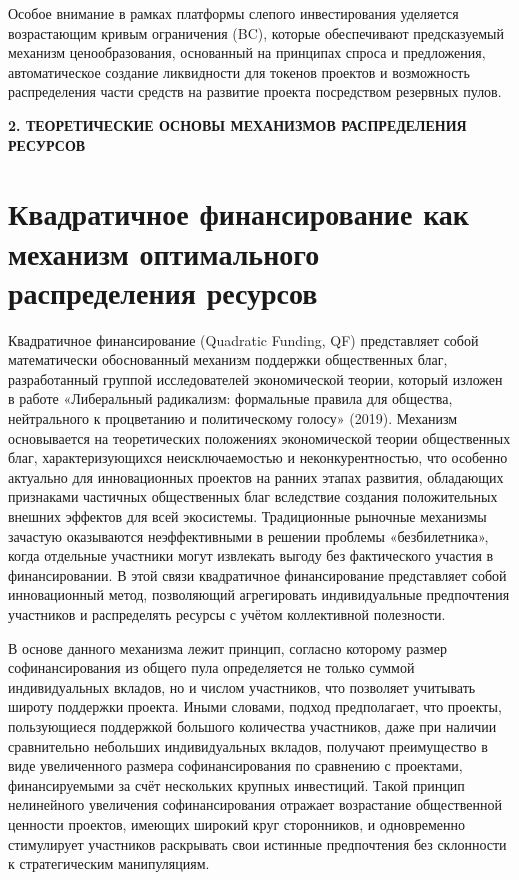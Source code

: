 \documentclass[
    candidate, %
    subf, %
    dotsinheaders=false,
]{disser}
\begin{document}
Особое внимание в рамках платформы слепого инвестирования уделяется возрастающим кривым ограничения (BC), которые обеспечивают предсказуемый механизм ценообразования, основанный на принципах спроса и предложения, автоматическое создание ликвидности для токенов проектов и возможность распределения части средств на развитие проекта посредством резервных пулов.

\newpage
\begin{center}
  \textbf{2. ТЕОРЕТИЧЕСКИЕ ОСНОВЫ МЕХАНИЗМОВ РАСПРЕДЕЛЕНИЯ РЕСУРСОВ}
  \end{center}

  \section{Квадратичное финансирование как механизм оптимального распределения ресурсов}

  Квадратичное финансирование (Quadratic Funding, QF) представляет собой математически обоснованный механизм поддержки общественных благ, разработанный группой исследователей экономической теории, который изложен в работе «Либеральный радикализм: формальные правила для общества, нейтрального к процветанию и политическому голосу» (2019). Механизм основывается на теоретических положениях экономической теории общественных благ, характеризующихся неисключаемостью и неконкурентностью, что особенно актуально для инновационных проектов на ранних этапах развития, обладающих признаками частичных общественных благ вследствие создания положительных внешних эффектов для всей экосистемы. Традиционные рыночные механизмы зачастую оказываются неэффективными в решении проблемы «безбилетника», когда отдельные участники могут извлекать выгоду без фактического участия в финансировании. В этой связи квадратичное финансирование представляет собой инновационный метод, позволяющий агрегировать индивидуальные предпочтения участников и распределять ресурсы с учётом коллективной полезности.

  В основе данного механизма лежит принцип, согласно которому размер софинансирования из общего пула определяется не только суммой индивидуальных вкладов, но и числом участников, что позволяет учитывать широту поддержки проекта. Иными словами, подход предполагает, что проекты, пользующиеся поддержкой большого количества участников, даже при наличии сравнительно небольших индивидуальных вкладов, получают преимущество в виде увеличенного размера софинансирования по сравнению с проектами, финансируемыми за счёт нескольких крупных инвестиций. Такой принцип нелинейного увеличения софинансирования отражает возрастание общественной ценности проектов, имеющих широкий круг сторонников, и одновременно стимулирует участников раскрывать свои истинные предпочтения без склонности к стратегическим манипуляциям.
\end{document}
